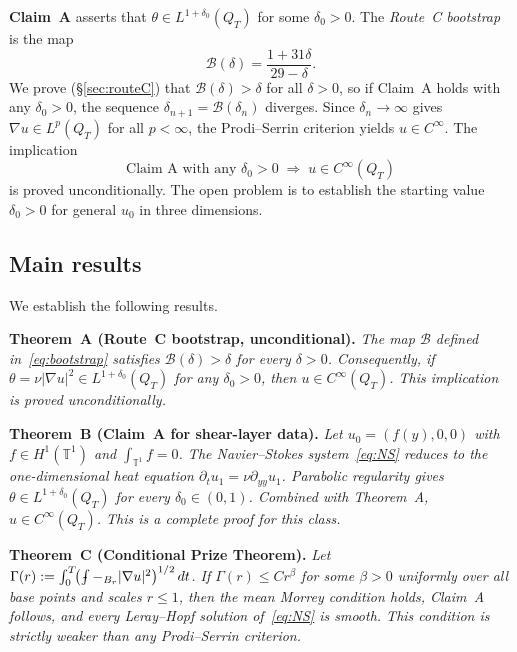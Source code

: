 \documentclass[11pt]{article}
\theoremstyle{definition}
\theoremstyle{remark}
\newcommand{\T}{\mathbb{T}}
\newcommand{\grad}{\nabla}
\newcommand{\Xint}{\mathop{\,\rlap{-}\!\!\int}\nolimits}
\newcommand{\dlt}{\delta}
\begin{document}
\textbf{Claim~A} asserts that $\theta \in L^{1+\dlt_0}(Q_T)$ for some
$\dlt_0 > 0$.  The \emph{Route~C bootstrap} is the map
\begin{equation}\label{eq:bootstrap}
  \mathcal{B}(\dlt) = \frac{1+31\dlt}{29-\dlt}.
\end{equation}
We prove (§\ref{sec:routeC}) that $\mathcal{B}(\dlt) > \dlt$ for all
$\dlt>0$, so if Claim~A holds with any $\dlt_0>0$, the sequence
$\dlt_{n+1} = \mathcal{B}(\dlt_n)$ diverges.  Since $\dlt_n\to\infty$
gives $\grad u\in L^p(Q_T)$ for all $p<\infty$, the Prodi--Serrin criterion
yields $u\in C^\infty$.  The implication
\[
  \text{Claim~A with any }\dlt_0>0
  \;\Longrightarrow\; u\in C^\infty(Q_T)
\]
is proved unconditionally.  The open problem is to establish the starting
value $\dlt_0>0$ for general $u_0$ in three dimensions.

\subsection{Main results}
\label{sec:intro-results}

We establish the following results.

\medskip
\noindent\textbf{Theorem~A (Route~C bootstrap, unconditional).}
\emph{The map $\mathcal{B}$ defined in~\eqref{eq:bootstrap} satisfies
$\mathcal{B}(\dlt) > \dlt$ for every $\dlt > 0$.  Consequently, if
$\theta = \nu|\grad u|^2 \in L^{1+\dlt_0}(Q_T)$ for any $\dlt_0>0$, then
$u\in C^\infty(Q_T)$.  This implication is proved unconditionally.}

\medskip
\noindent\textbf{Theorem~B (Claim~A for shear-layer data).}
\emph{Let $u_0 = (f(y),0,0)$ with $f\in H^1(\T^1)$ and $\int_{\T^1} f = 0$.
The Navier--Stokes system~\eqref{eq:NS} reduces to the one-dimensional heat
equation $\partial_t u_1 = \nu\partial_{yy}u_1$.  Parabolic regularity gives
$\theta \in L^{1+\dlt_0}(Q_T)$ for every $\dlt_0\in(0,1)$.  Combined with
Theorem~A, $u\in C^\infty(Q_T)$.  This is a complete proof for this class.}

\medskip
\noindent\textbf{Theorem~C (Conditional Prize Theorem).}
\emph{Let $\Gamma(r) := \int_0^T\!\bigl(\Xint-_{B_r}|\grad u|^2\bigr)^{1/2}\,dt$.
If $\Gamma(r)\leq Cr^\beta$ for some $\beta>0$ uniformly over all base points
and scales $r\leq 1$, then the mean Morrey condition holds, Claim~A follows,
and every Leray--Hopf solution of~\eqref{eq:NS} is smooth.  This condition is
strictly weaker than any Prodi--Serrin criterion.}
\end{document}
